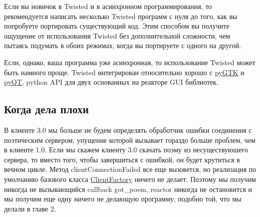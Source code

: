 
Если вы новичок в Twisted и в асинхронном программирования, то 
рекомендуется написать несколько Twisted программ с нуля до того, как 
вы попробуете портировать существующий код. Этим способом вы получите 
ощущение от использования Twisted без дополнительной сложности, 
чем пытаясь подумать в обоих режимах, когда вы портируете с одного на 
другой.


Если, однако, ваша программа уже асинхронная, то 
использование Twisted может быть намного проще. Twisted 
интегрирован относительно хорошо с 
\href{http://pygtk.org/}{pyGTK} и
\href{http://wiki.python.org/moin/PyQt}{pyQT}, python API 
для двух основанных на реакторе GUI библиотек.

\subsection{Когда дела плохи}


В клиенте 3.0 мы больше не будем определять 
обработчик ошибки соединения с поэтическим сервером, 
упущение которой вызывает гораздо больше проблем, чем в клиенте 1.0. 
Если мы скажем клиенту 3.0 скачать поэму из несуществуюшего 
сервера, то вместо того, чтобы завершиться с ошибкой, он будет крутиться в вечном цикле. 
Метод clientConnectionFailed все еще вызовется, но 
реализация по умолчанию базового класса 
\href{http://twistedmatrix.com/trac/browser/tags/releases/twisted-8.2.0/twisted/internet/protocol.py#L103}{ClientFactory} 
ничего не 
делает. Поэтому мы получим никогда не вызывающийся callback got\_poem,
reactor никогда не остановится и мы получим еще одну ничего 
не делающую программу, подобно той, что мы делали в главе 2.


